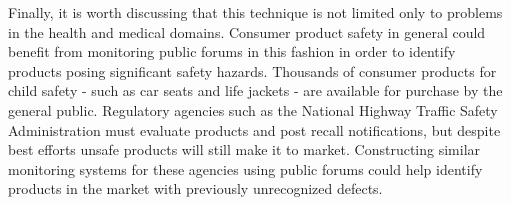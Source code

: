 \documentclass[twoside,11pt]{article}
\begin{document}
Finally, it is worth discussing that this technique is not limited only to problems in the health and medical domains. Consumer product safety in general could benefit from monitoring public forums in this fashion in order to identify products posing significant safety hazards. Thousands of consumer products for child safety - such as car seats and life jackets - are available for purchase by the general public. Regulatory agencies such as the National Highway Traffic Safety Administration must evaluate products and post recall notifications, but despite best efforts unsafe products will still make it to market. Constructing similar monitoring systems for these agencies using public forums could help identify products in the market with previously unrecognized defects.


\vskip 0.2in
\end{document}
